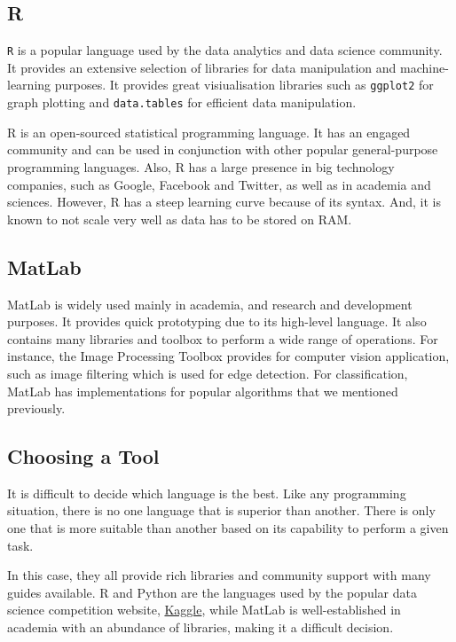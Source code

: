 \subsection{R}
\texttt{R} is a popular language used by the data analytics and data science community. It provides an extensive selection of libraries for data manipulation and machine-learning purposes. It provides great visiualisation libraries such as \texttt{ggplot2} for graph plotting and \texttt{data.tables} for efficient data manipulation.

R is an open-sourced statistical programming language. It has an engaged community and can be used in conjunction with other popular general-purpose programming languages. Also, R has a large presence in big technology companies, such as Google, Facebook and Twitter, as well as in academia and sciences\footnotemark.  However, R has a steep learning curve because of its syntax. And, it is known to not scale very well as data has to be stored on RAM.


\subsection{MatLab}
MatLab is widely used mainly in academia, and research and development purposes. It provides quick prototyping due to its high-level language. It also contains many libraries and toolbox to perform a wide range of operations. For instance, the Image Processing Toolbox provides for computer vision application, such as image filtering which is used for edge detection. For classification, MatLab has implementations for popular algorithms that we mentioned previously.

\subsection{Choosing a Tool}
It is difficult to decide which language is the best. Like any programming situation, there is no one language that is superior than another. There is only one that is more suitable than another based on its capability to perform a given task.

In this case, they all provide rich libraries and community support with many guides available. R and Python are the languages used by the popular data science competition website, \href{http://www.kaggle.com}{Kaggle}, while MatLab is well-established in academia with an abundance of libraries, making it a difficult decision.

